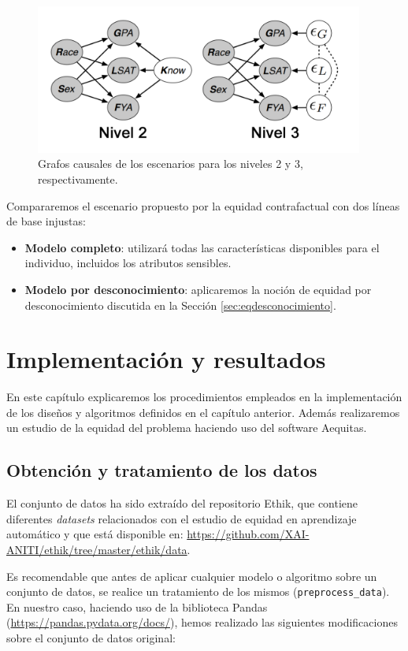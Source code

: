\documentclass[oneside,openright,titlepage,numbers=noenddot,openany,headinclude,footinclude=true,
cleardoublepage=empty,abstractoff,BCOR=5mm,paper=a4,fontsize=12pt,main=spanish]{scrreprt}
\begin{document}
\begin{figure}[h]
	\centering
	\includegraphics[width=10.8cm]{causales_pract.png}
	\caption{Grafos causales de los escenarios para los niveles 2 y 3, respectivamente.}
    \label{fig:practicausales}
\end{figure}

Compararemos el escenario propuesto por la equidad contrafactual con dos líneas de base injustas: 

\begin{itemize}
    \item \textbf{Modelo completo}: utilizará todas las características disponibles para el individuo, incluidos los atributos sensibles.
    \item \textbf{Modelo por desconocimiento}: aplicaremos la noción de equidad por desconocimiento discutida en la Sección \ref{sec:eqdesconocimiento}.
\end{itemize} 

\chapter{Implementación y resultados} \label{ch:implementaresult}

En este capítulo explicaremos los procedimientos empleados en la implementación de los diseños y algoritmos definidos en el capítulo anterior. Además realizaremos un estudio de la equidad del problema haciendo uso del software Aequitas.

\section{Obtención y tratamiento de los datos}

El conjunto de datos ha sido extraído del repositorio Ethik, que contiene diferentes \textit{datasets} relacionados con el estudio de equidad en aprendizaje automático y que está disponible en: \url{https://github.com/XAI-ANITI/ethik/tree/master/ethik/data}.

Es recomendable que antes de aplicar cualquier modelo o algoritmo sobre un conjunto de datos, se realice un tratamiento de los mismos (\texttt{preprocess\_data}). En nuestro caso, haciendo uso de la biblioteca Pandas (\url{https://pandas.pydata.org/docs/}), hemos realizado las siguientes modificaciones sobre el conjunto de datos original:
\end{document}
